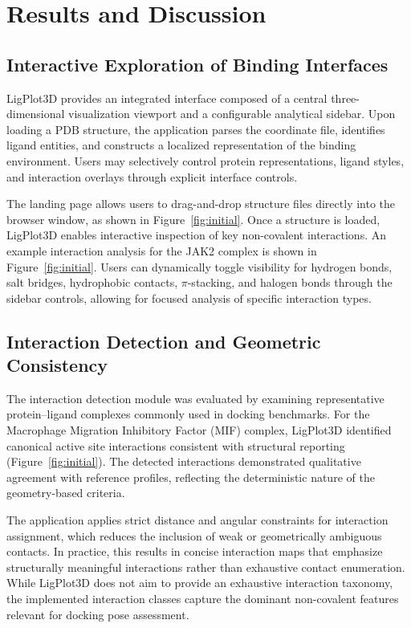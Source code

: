 \documentclass[lettersize,journal]{IEEEtran}
\begin{document}
\section{Results and Discussion}

\subsection{Interactive Exploration of Binding Interfaces}
LigPlot3D provides an integrated interface composed of a central three-dimensional visualization viewport and a configurable analytical sidebar. Upon loading a PDB structure, the application parses the coordinate file, identifies ligand entities, and constructs a localized representation of the binding environment. Users may selectively control protein representations, ligand styles, and interaction overlays through explicit interface controls.

The landing page allows users to drag-and-drop structure files directly into the browser window, as shown in Figure~\ref{fig:initial}. Once a structure is loaded, LigPlot3D enables interactive inspection of key non-covalent interactions. An example interaction analysis for the JAK2 complex is shown in Figure~\ref{fig:initial}. Users can dynamically toggle visibility for hydrogen bonds, salt bridges, hydrophobic contacts, $\pi$-stacking, and halogen bonds through the sidebar controls, allowing for focused analysis of specific interaction types.

\subsection{Interaction Detection and Geometric Consistency}
The interaction detection module was evaluated by examining representative protein--ligand complexes commonly used in docking benchmarks. For the Macrophage Migration Inhibitory Factor (MIF) complex\cite{crichlow2009structural}, LigPlot3D identified canonical active site interactions consistent with structural reporting (Figure~\ref{fig:initial}). The detected interactions demonstrated qualitative agreement with reference profiles, reflecting the deterministic nature of the geometry-based criteria.

The application applies strict distance and angular constraints for interaction assignment, which reduces the inclusion of weak or geometrically ambiguous contacts. In practice, this results in concise interaction maps that emphasize structurally meaningful interactions rather than exhaustive contact enumeration. While LigPlot3D does not aim to provide an exhaustive interaction taxonomy, the implemented interaction classes capture the dominant non-covalent features relevant for docking pose assessment.
\end{document}
